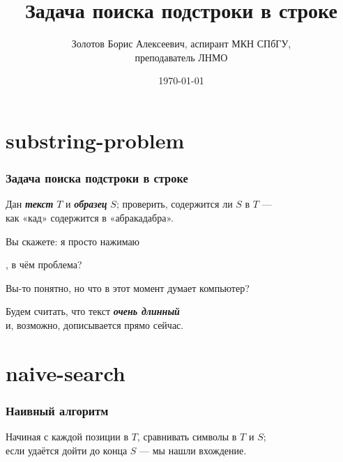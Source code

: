 \documentclass[11pt,aspectratio=169,svgnames]{beamer}
\title{Задача поиска подстроки в строке}
\date{\today}
\author{Золотов Борис Алексеевич, аспирант МКН СПбГУ, \\ преподаватель ЛНМО}
\institute{«Лига Лекторов», 3 сезон, полуфинал}
\begin{document}
 \maketitle


\section{substring-problem}

\begin{frame} \frametitle{Задача поиска подстроки в строке}
	Дан {\itshape\bfseries текст} \(T\) и {\itshape\bfseries образец} \(S\); проверить,
	содержится ли \(S\) в \(T\) —\\
	как «кад» содержится в «абракадабра». \bigskip\bigskip \pause

	Вы скажете: я просто нажимаю\ \  , в чём проблема? \bigskip\bigskip \pause

	Вы-то понятно, но что в этот момент думает компьютер? \bigskip \pause

	Будем считать, что текст {\bfseries\itshape очень длинный} \\
	и, возможно, дописывается прямо сейчас.
\end{frame}


\section{naive-search}

\begin{frame} \frametitle{Наивный алгоритм}
Начиная с каждой позиции в \(T\), сравнивать символы в \(T\) и \(S\);\\
если удаётся дойти до конца \(S\) — мы нашли вхождение. \bigskip

\begin{center}  \end{center}
\end{frame}
\end{document}
